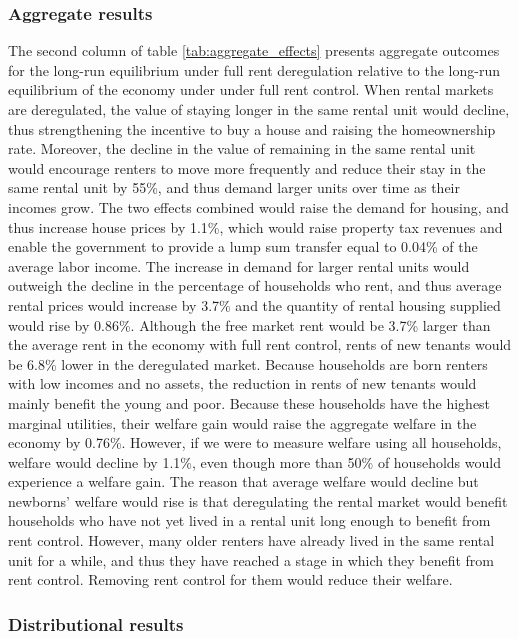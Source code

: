 \documentclass[parskip=full]{article}
\begin{document}
\subsubsection{Aggregate results} The second column of table \ref{tab:aggregate_effects} presents aggregate outcomes for the long-run equilibrium under full rent deregulation relative to the long-run equilibrium of the economy under under full rent control. When rental markets are deregulated, the value of staying longer in the same rental unit would decline, thus strengthening the incentive to buy a house and raising the homeownership rate. Moreover, the decline in the value of remaining in the same rental unit would encourage renters to move more frequently and reduce their stay in the same rental unit by 55\%, and thus demand larger units over time as their incomes grow. The two effects combined would raise the demand for housing, and thus increase house prices by 1.1\%, which would raise property tax revenues and enable the government to provide a lump sum transfer equal to 0.04\% of the average labor income. The increase in demand for larger rental units would outweigh the decline in the percentage of households who rent, and thus average rental prices would increase by 3.7\% and the quantity of rental housing supplied would rise by 0.86\%. Although the free market rent would be 3.7\% larger than the average rent in the economy with full rent control, rents of new tenants would be 6.8\% lower in the deregulated market. Because households are born renters with low incomes and no assets, the reduction in rents of new tenants would mainly benefit the young and poor. Because these households have the highest marginal utilities, their welfare gain would raise the aggregate welfare in the economy by 0.76\%. However, if we were to measure welfare using all households, welfare would decline by 1.1\%, even though more than 50\% of households would experience a welfare gain. The reason that average welfare would decline but newborns' welfare would rise is that deregulating the rental market would benefit households who have not yet lived in a rental unit long enough to benefit from rent control. However, many older renters have already lived in the same rental unit for a while, and thus they have reached a stage in which they benefit from rent control. Removing rent control for them would reduce their welfare.

\subsubsection{Distributional results} 
\end{document}
